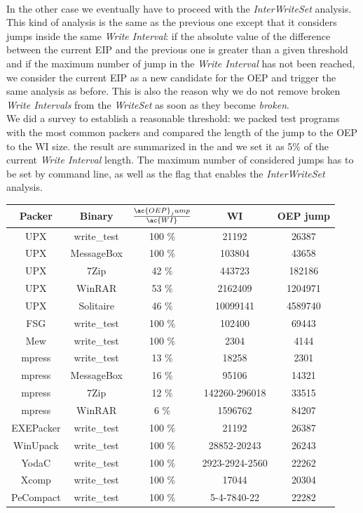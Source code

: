 \paragraph{}
In the other case we eventually have to proceed with the \textit{InterWriteSet} analysis. This kind of analysis is the same as the previous one except that it considers jumps inside the same \textit{Write Interval}: if the absolute value of the difference between the current \ac{EIP} and the previous one is greater than a given threshold and if the maximum number of jump in the \textit{Write Interval} has not been reached, we consider the current \ac{EIP} as a new candidate for the \ac{OEP} and trigger the same analysis as before. This is also the reason why we do not remove broken \textit{Write Intervals} from the \textit{WriteSet} as soon as they become \textit{broken}.\\
We did a survey to establish a reasonable threshold: we packed test programs with the most common packers and compared the length of the jump to the \ac{OEP} to the \ac{WI} size. the result are summarized in the  and we set it as 5\% of the current  \textit{Write Interval} length. The maximum number of considered jumps has to be set by command line, as well as the flag that enables the \textit{InterWriteSet} analysis.
\begin{center}
    \begin{tabular}[width=\textwidth]{| c | c | c | c | c |}
    \hline
    \textbf{Packer} & \textbf{Binary} & \textbf{$\frac{\ac{OEP}_jump}{\ac{WI}}$} & \textbf{\ac{WI}} & \textbf{\ac{OEP} jump} \\ \hline
    UPX & write\_test &	100 \% & 21192 & 26387 \\ \hline
    UPX & MessageBox & 100 \% & 103804 & 43658 \\ \hline
    UPX & 7Zip & 42 \% & 443723 & 182186 \\ \hline
    UPX & WinRAR & 53 \% & 2162409 & 1204971 \\ \hline
    UPX & Solitaire & 46 \% & 10099141 & 4589740 \\ \hline
    FSG & write\_test & 100 \% & 102400 & 69443 \\ \hline
    Mew & write\_test & 100 \% & 2304 & 4144 \\ \hline
    mpress & write\_test & 13 \% & 18258 & 2301 \\ \hline
	mpress & MessageBox & 16 \% & 95106 & 14321 \\ \hline
	mpress & 7Zip & 12 \% & 142260-296018 & 33515 \\ \hline
	mpress & WinRAR & 6 \% & 1596762 & 84207 \\ \hline
	EXEPacker & write\_test & 100 \% & 21192 & 26387 \\ \hline
	WinUpack & write\_test & 100 \% & 28852-20243 & 26243 \\ \hline
	YodaC & write\_test & 100 \% & 2923-2924-2560 & 22262 \\ \hline
	Xcomp & write\_test & 100 \% & 17044 & 20304 \\ \hline
	PeCompact & write\_test & 100 \% & 5-4-7840-22 & 22282 \\ \hline
    \end{tabular}
\end{center}
